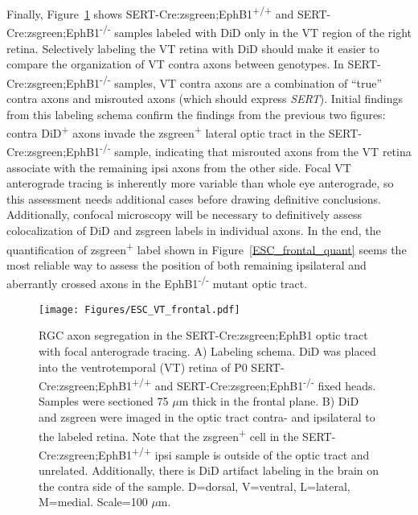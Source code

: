 Finally, Figure~\ref{ESCVTfrontal} shows SERT-Cre:zsgreen;EphB1\textsuperscript{+/+} and SERT-Cre:zsgreen;EphB1\textsuperscript{-/-} samples labeled with DiD only in the VT region of the right retina.
Selectively labeling the VT retina with DiD should make it easier to compare the organization of VT contra axons between genotypes.
In SERT-Cre:zsgreen;EphB1\textsuperscript{-/-} samples, VT contra axons are a combination of ``true'' contra axons and misrouted axons (which should express \emph{SERT}).
Initial findings from this labeling schema confirm the findings from the previous two figures: contra DiD\textsuperscript{+} axons invade the zsgreen\textsuperscript{+} lateral optic tract in the SERT-Cre:zsgreen;EphB1\textsuperscript{-/-} sample, indicating that misrouted axons from the VT retina associate with the remaining ipsi axons from the other side.
Focal VT anterograde tracing is inherently more variable than whole eye anterograde, so this assessment needs additional cases before drawing definitive conclusions.
Additionally, confocal microscopy will be necessary to definitively assess colocalization of DiD and zsgreen labels in individual axons.
In the end, the quantification of zsgreen\textsuperscript{+} label shown in Figure~\ref{ESC_frontal_quant} seems the most reliable way to assess the position of both remaining ipsilateral and aberrantly crossed axons in the EphB1\textsuperscript{-/-} mutant optic tract.
\begin{figure}[hbtp]
    \begin{center}
        \texttt{[image: Figures/ESC\_VT\_frontal.pdf]}
        \caption[RGC axon segregation in the SERT-Cre:zsgreen;EphB1 optic tract with focal anterograde tracing.]
        {RGC axon segregation in the SERT-Cre:zsgreen;EphB1 optic tract with focal anterograde tracing.
        A) Labeling schema.
        DiD was placed into the ventrotemporal (VT) retina of P0 SERT-Cre:zsgreen;EphB1\textsuperscript{+/+} and SERT-Cre:zsgreen;EphB1\textsuperscript{-/-} fixed heads.
        Samples were sectioned 75 $\mu$m thick in the frontal plane.
        B) DiD and zsgreen were imaged in the optic tract contra- and ipsilateral to the labeled retina.
        Note that the zsgreen\textsuperscript{+} cell in the SERT-Cre:zsgreen;EphB1\textsuperscript{+/+} ipsi sample is outside of the optic tract and unrelated.
        Additionally, there is DiD artifact labeling in the brain on the contra side of the sample.
        D=dorsal, V=ventral, L=lateral, M=medial.
        Scale=100 $\mu$m.}
        \label{ESCVTfrontal}
    \end{center}
\end{figure}